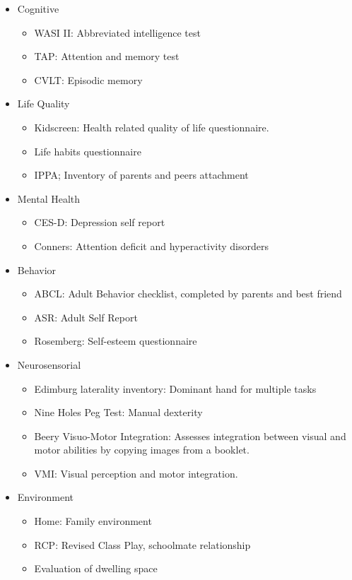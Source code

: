\begin{itemize}
	\item Cognitive
	\begin{itemize}
		\item WASI II: Abbreviated intelligence test
		\item TAP: Attention and memory test
		\item CVLT: Episodic memory
	\end{itemize}
	\item Life Quality
	\begin{itemize}
		\item Kidscreen: Health related quality of life questionnaire.
		\item Life habits questionnaire
		\item IPPA; Inventory of parents and peers attachment
	\end{itemize}
	\item Mental Health
	\begin{itemize}
		\item CES-D: Depression self report
		\item Conners: Attention deficit and hyperactivity disorders
	\end{itemize}
	\item Behavior
	\begin{itemize}
		\item ABCL: Adult Behavior checklist, completed by parents and best friend
		\item ASR: Adult Self Report
		\item Rosemberg: Self-esteem questionnaire
	\end{itemize}
	\item Neurosensorial 
	\begin{itemize}
		\item Edimburg laterality inventory: Dominant hand for multiple tasks
		\item Nine Holes Peg Test: Manual dexterity
		\item Beery Visuo-Motor Integration: Assesses integration between visual and motor abilities by copying images from a booklet.
		\item VMI: Visual perception and motor integration.
	\end{itemize}
	\item Environment
	\begin{itemize}
		\item Home: Family environment
		\item RCP: Revised Class Play, schoolmate relationship
		\item Evaluation of dwelling space
	\end{itemize}
\end{itemize}

